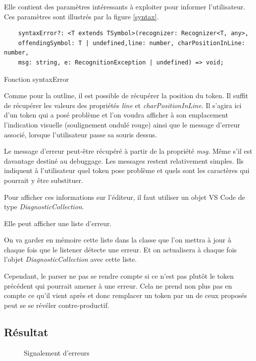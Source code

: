 \documentclass[
    iict, %
    il, %
]{heig-tb}
\begin{document}
Elle contient des paramètres intéressants à exploiter pour informer l'utilisateur.
Ces paramètres sont illustrés par la figure \ref{syntax}.

\begin{listing}[!ht]
    \begin{verbatim}
    syntaxError?: <T extends TSymbol>(recognizer: Recognizer<T, any>,
    offendingSymbol: T | undefined,line: number, charPositionInLine: number,
    msg: string, e: RecognitionException | undefined) => void;
    \end{verbatim}
    \caption{Fonction syntaxError}
    \label{syntaxError}
\end{listing}

Comme pour la outline, il est possible de récupérer la position du token. Il suffit de récupérer les valeurs des propriétés \emph{line} et \emph{charPositionInLine}.
Il s'agira ici d'un token qui a posé problème et l'on voudra afficher à son emplacement l'indication visuelle (soulignement ondulé rouge) ainsi que le message d'erreur associé, lorsque l'utilisateur passe
sa souris dessus.

Le message d'erreur peut-être récupéré à partir de la propriété \emph{msg}. Même s'il est davantage destiné au debuggage.
Les messages restent relativement simples. Ils indiquent à l'utilisateur quel token pose problème et quels sont les caractères qui pourrait y être substituer.

Pour afficher ces informations sur l'éditeur, il faut utiliser un objet VS Code de type \emph{DiagnosticCollection}.

Elle peut afficher une liste d'erreur.

On va garder en mémoire cette liste dans la classe que l'on mettra à jour à chaque fois que le listener détecte une erreur.
Et on actualisera à chaque fois l'objet \emph{DiagnosticCollection} avec cette liste.

Cependant, le parser ne pas se rendre compte si ce n'est pas plutôt le token précédent qui pourrait amener à une erreur.
Cela ne prend non plus pas en compte ce qu'il vient après et donc remplacer un token par un de ceux proposés peut se se révéler contre-productif.

\subsection{Résultat}

\begin{figure}[!h]
    \begin{center}
    \end{center}
    \caption[Signalement d'erreurs]{\label{lint} Signalement d'erreurs}
\end{figure}
\end{document}
